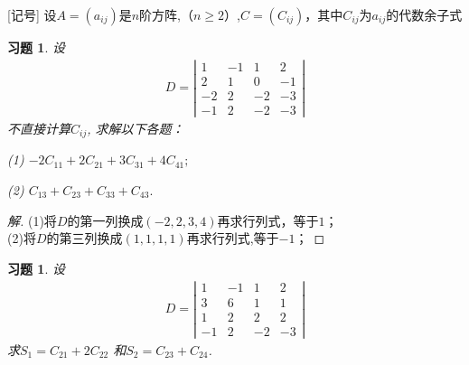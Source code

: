 \documentclass[UTF8]{ctexart}
\newtheorem{ex}[thm]{习题}
\begin{document}
[记号] 设$A=(a_{ij})$是$n$阶方阵,（$n\geq 2$）,$C=(C_{ij})$，其中$C_{ij}$为$a_{ij}$的代数余子式
\begin{ex}
设
\begin{eqnarray*}
D=\left |
\begin{array}{cccc}
 1 &-1 &1 &2\\
 2 &1 &0 &-1\\
 -2 & 2 &-2 &-3\\
 -1 &2 &-2 &-3
\end{array} \right|
\end{eqnarray*}
不直接计算$C_{ij}$, 求解以下各题：

(1) $-2C_{11}+2C_{21}+3C_{31}+4C_{41};$

(2) $C_{13}+C_{23}+C_{33}+C_{43}.$
\end{ex}
\begin{proof}[解]
(1)将$D$的第一列换成$(-2, 2, 3, 4)$再求行列式，等于$1$；\\
(2)将$D$的第三列换成$(1, 1, 1, 1)$再求行列式,等于$-1$；
\end{proof}

\begin{ex}
设
\begin{eqnarray*}
 D=\left |
\begin{array}{cccc}
1 &-1 &1 &2 \\ 3 &6 &1 &1\\ 1 &2 &2 &2\\ -1 &2 & -2& -3
\end{array}
\right |
\end{eqnarray*} 求$S_1=C_{21}+2C_{22}$ 和$S_2=C_{23}+C_{24}$.
\end{ex}
\end{document}
